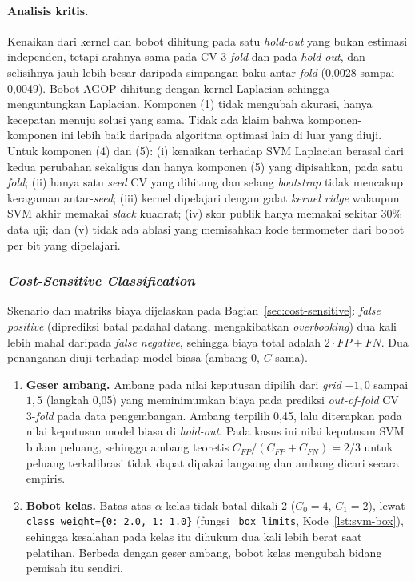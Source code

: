 \paragraph{Analisis kritis.} Kenaikan dari kernel dan bobot dihitung pada satu \textit{hold-out} yang bukan estimasi independen, tetapi arahnya sama pada CV 3-\textit{fold} dan pada \textit{hold-out}, dan selisihnya jauh lebih besar daripada simpangan baku antar-\textit{fold} (0,0028 sampai 0,0049). Bobot AGOP dihitung dengan kernel Laplacian sehingga menguntungkan Laplacian. Komponen (1) tidak mengubah akurasi, hanya kecepatan menuju solusi yang sama. Tidak ada klaim bahwa komponen-komponen ini lebih baik daripada algoritma optimasi lain di luar yang diuji. Untuk komponen (4) dan (5): (i) kenaikan terhadap SVM Laplacian berasal dari kedua perubahan sekaligus dan hanya komponen (5) yang dipisahkan, pada satu \textit{fold}; (ii) hanya satu \textit{seed} CV yang dihitung dan selang \textit{bootstrap} tidak mencakup keragaman antar-\textit{seed}; (iii) kernel dipelajari dengan galat \textit{kernel ridge} walaupun SVM akhir memakai \textit{slack} kuadrat; (iv) skor publik hanya memakai sekitar 30\% data uji; dan (v) tidak ada ablasi yang memisahkan kode termometer dari bobot per bit yang dipelajari.

\subsubsection{\textit{Cost-Sensitive Classification}}
\label{subsubsec:svm-cost}
Skenario dan matriks biaya dijelaskan pada Bagian~\ref{sec:cost-sensitive}: \textit{false positive} (diprediksi batal padahal datang, mengakibatkan \textit{overbooking}) dua kali lebih mahal daripada \textit{false negative}, sehingga biaya total adalah $2 \cdot FP + FN$. Dua penanganan diuji terhadap model biasa (ambang 0, $C$ sama).
\begin{enumerate}
	\item \textbf{Geser ambang.} Ambang pada nilai keputusan dipilih dari \textit{grid} $-1{,}0$ sampai $1{,}5$ (langkah 0,05) yang meminimumkan biaya pada prediksi \textit{out-of-fold} CV 3-\textit{fold} pada data pengembangan. Ambang terpilih 0,45, lalu diterapkan pada nilai keputusan model biasa di \textit{hold-out}. Pada kasus ini nilai keputusan SVM bukan peluang, sehingga ambang teoretis $C_{FP}/(C_{FP}+C_{FN}) = 2/3$ untuk peluang terkalibrasi \cite{elkan2001cost} tidak dapat dipakai langsung dan ambang dicari secara empiris.
	\item \textbf{Bobot kelas.} Batas atas $\alpha$ kelas tidak batal dikali 2 ($C_0 = 4$, $C_1 = 2$), lewat \texttt{class\_weight=\{0: 2.0, 1: 1.0\}} (fungsi \texttt{\_box\_limits}, Kode~\ref{lst:svm-box}), sehingga kesalahan pada kelas itu dihukum dua kali lebih berat saat pelatihan. Berbeda dengan geser ambang, bobot kelas mengubah bidang pemisah itu sendiri.
\end{enumerate}


